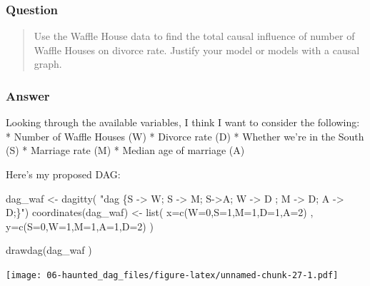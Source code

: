 \documentclass[
]{book}
\newenvironment{Shaded}{\begin{snugshade}}{\end{snugshade}}
\newcommand{\AttributeTok}[1]{\textcolor[rgb]{0.77,0.63,0.00}{#1}}
\newcommand{\DecValTok}[1]{\textcolor[rgb]{0.00,0.00,0.81}{#1}}
\newcommand{\FunctionTok}[1]{\textcolor[rgb]{0.00,0.00,0.00}{#1}}
\newcommand{\NormalTok}[1]{#1}
\newcommand{\OtherTok}[1]{\textcolor[rgb]{0.56,0.35,0.01}{#1}}
\newcommand{\StringTok}[1]{\textcolor[rgb]{0.31,0.60,0.02}{#1}}
\begin{document}
\hypertarget{question-55}{%
\subsubsection*{Question}\label{question-55}}

\begin{quote}
Use the Waffle House data to find the total causal influence of number of Waffle Houses on divorce rate. Justify your model or models with a causal graph.
\end{quote}

\hypertarget{answer-55}{%
\subsubsection*{Answer}\label{answer-55}}

Looking through the available variables, I think I want to consider the following:
* Number of Waffle Houses (W)
* Divorce rate (D)
* Whether we're in the South (S)
* Marriage rate (M)
* Median age of marriage (A)

Here's my proposed DAG:

\begin{Shaded}
\begin{Highlighting}[]
\NormalTok{dag\_waf }\OtherTok{\textless{}{-}} \FunctionTok{dagitty}\NormalTok{( }\StringTok{"dag \{S {-}\textgreater{} W; S {-}\textgreater{} M; S{-}\textgreater{}A; W {-}\textgreater{} D ; M {-}\textgreater{} D; A {-}\textgreater{} D;\}"}\NormalTok{)}
\FunctionTok{coordinates}\NormalTok{(dag\_waf) }\OtherTok{\textless{}{-}} \FunctionTok{list}\NormalTok{( }\AttributeTok{x=}\FunctionTok{c}\NormalTok{(}\AttributeTok{W=}\DecValTok{0}\NormalTok{,}\AttributeTok{S=}\DecValTok{1}\NormalTok{,}\AttributeTok{M=}\DecValTok{1}\NormalTok{,}\AttributeTok{D=}\DecValTok{1}\NormalTok{,}\AttributeTok{A=}\DecValTok{2}\NormalTok{) , }\AttributeTok{y=}\FunctionTok{c}\NormalTok{(}\AttributeTok{S=}\DecValTok{0}\NormalTok{,}\AttributeTok{W=}\DecValTok{1}\NormalTok{,}\AttributeTok{M=}\DecValTok{1}\NormalTok{,}\AttributeTok{A=}\DecValTok{1}\NormalTok{,}\AttributeTok{D=}\DecValTok{2}\NormalTok{) )}

\FunctionTok{drawdag}\NormalTok{(dag\_waf )}
\end{Highlighting}
\end{Shaded}

\texttt{[image: 06-haunted\_dag\_files/figure-latex/unnamed-chunk-27-1.pdf]}
\end{document}
